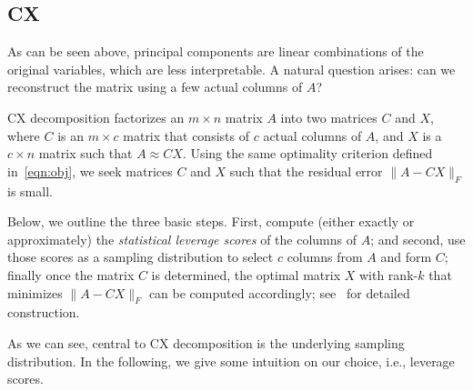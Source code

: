 \subsection{CX}
As can be seen above, principal components are linear combinations of the original variables, which are less interpretable. A natural question arises: can we reconstruct the matrix using a few actual columns of $A$?

CX decomposition factorizes an $m \times n$ matrix $A$ into two matrices $C$ and $X$, where $C$ is an $m\times c$ matrix that consists of $c$ actual columns
of $A$, and $X$ is a $c \times n$ matrix such that $A\approx CX$.
Using the same optimality criterion defined in~\eqref{eqn:obj}, we seek matrices $C$ and $X$ such that the residual error $\|A-CX\|_F$ is small.

Below, we outline the three basic steps. First, compute (either exactly or approximately) the {\it statistical leverage scores} of the columns of $A$;
and second, use those scores as a sampling distribution to select $c$ columns from $A$ and form $C$;
finally once the matrix $C$ is determined, the optimal matrix $X$ with rank-$k$ that minimizes $\|A-CX\|_F$ can be computed accordingly; see~\cite{DMM08} for detailed construction.

As we can see, central to CX decomposition is the underlying sampling distribution.
In the following, we give some intuition on our choice, i.e., leverage scores.


